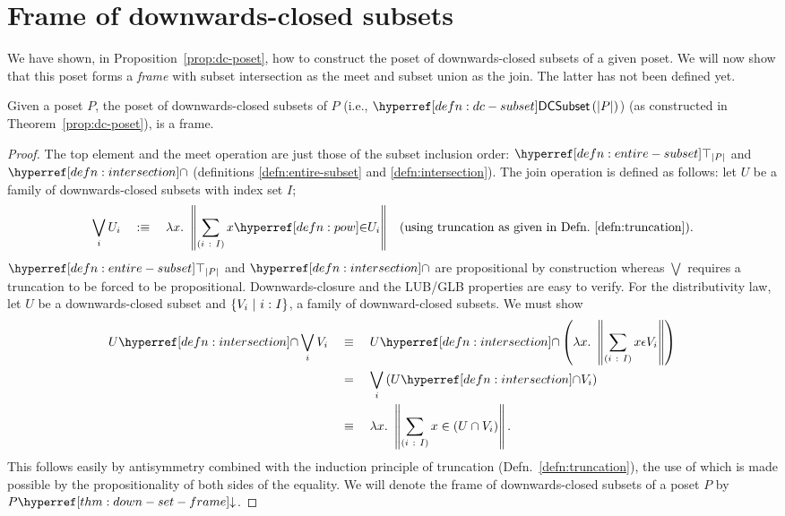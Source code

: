 \section{Frame of downwards-closed subsets}\label{sec:down-set-frame}

We have shown, in Proposition~\ref{prop:dc-poset}, how to construct the poset of
downwards-closed subsets of a given poset. We will now show that this poset forms a
\emph{frame} with subset intersection as the meet and subset union as the join. The latter
has not been defined yet.

\begin{thm}\label{thm:down-set-frame}
  Given a poset $P$, the poset of downwards-closed subsets of $P$ (i.e.,
  $\dcsubset{\abs{P}}$) (as constructed in Theorem~\ref{prop:dc-poset}), is a frame.
\end{thm}
\begin{proof}
  The top element and the meet operation are just those of the subset inclusion order:
  $\entire{\abs{P}}$ and $\intersectnm{}$ (definitions \ref{defn:entire-subset} and
  \ref{defn:intersection}). The join operation is defined as follows: let $U$ be a family
  of downwards-closed subsets with index set $I$;
  \begin{align*}
    \bigvee_i U_i \quad\is\quad \lambda x.~ \trunc{\sigmaty{i}{I}{\mempow{x}{U_i}}}
      && \text{(using truncation as given in Defn.~\ref{defn:truncation})}.
  \end{align*}
  $\entire{\abs{P}}$ and $\intersectnm{}$ are propositional by construction whereas $\bigvee$
  requires a truncation to be forced to be propositional. Downwards-closure and the
  LUB/GLB properties are easy to verify. For the distributivity law, let $U$ be a
  downwards-closed subset and $\left\{  V_i ~|~ i\hspace{0.1mm}:\hspace{0.1mm}I  \right\}$, a family of
  downward-closed subsets. We must show
  \begin{align*}
    \intersect{U}{\bigvee_i V_i}
      \quad&\equiv\quad \intersect{U}{\left(\lambda x.~ \trunc{\sigmaty{i}{I}{x \epsilon V_i}}\right)}\\
      \quad&=\quad \bigvee_i \left(\intersect{U}{V_i} \right)\\
      \quad&\equiv\quad \lambda x.~ \trunc{\sigmaty{i}{I}{x \in (U \cap V_i)}}.
  \end{align*}
  This follows easily by antisymmetry combined with the induction principle of truncation
  (Defn.~\ref{defn:truncation}), the use of which is made possible by the propositionality
  of both sides of the equality. We will denote the frame of downwards-closed subsets of a
  poset $P$ by $\dcframe{P}$.
\end{proof}

